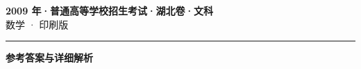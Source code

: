 \documentclass[zihao=5, a4paper]{ctexart}
\begin{document}
\begin{center}
  {\Large\bfseries 2009 年·普通高等学校招生考试·湖北卷·文科}\\[4pt]
  {\large 数学 · 印刷版}
\end{center}
\medskip
{}

\par\bigskip\hrule\bigskip
{}
\begin{center}{\large\bfseries 参考答案与详细解析}\end{center}
\smallskip

\end{document}
